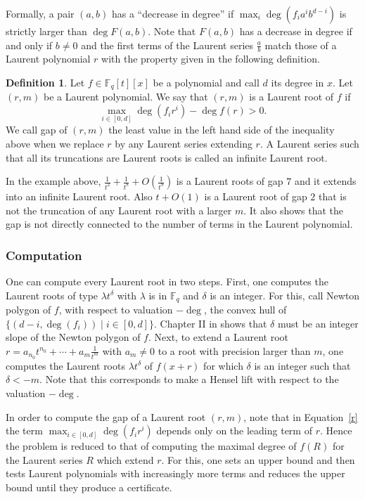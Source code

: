 \documentclass[a4wide]{article}
\newcommand{\F}{{\mathbb F}}
\theoremstyle{plain}
\theoremstyle{definition}
\newtheorem{deff}[theo]{Definition}
\theoremstyle{remark}
\begin{document}
Formally, a pair $(a,b)$ has a ``decrease in degree'' if $\max_i \deg( f_i
a^i b^{d-i})$ is strictly larger than $\deg F(a,b)$. Note that $F(a,b)$
has a decrease in degree if and only if $b\neq 0$ and the first terms of the Laurent series
$\frac{a}{b}$ match those of a Laurent polynomial $r$ with the property
given in the following definition.

\begin{deff}\label{def-Laurent}
	Let $f\in\F_q[t][x]$ be a polynomial and call $d$ its degree in $x$.
	Let $(r,m)$ be a Laurent polynomial. We say that $(r,m)$ is a Laurent root of $f$ if \begin{equation}\label{r}
	\max_{i\in[0,d]}\deg(f_ir^i)-\deg f(r) > 0.
	\end{equation}
	We call gap of $(r,m)$ the least value in the left hand side of the
	inequality above when we
	replace $r$ by any Laurent series extending $r$. A Laurent series such that
all its truncations are Laurent roots is called an infinite Laurent root. 
\end{deff}
In the example above, $\frac{1}{t^2}+\frac{1}{t^8}+O(\frac{1}{t^9})$ is a
Laurent roots of gap $7$ and it extends into an infinite Laurent root. Also
$t+O(1)$ is a Laurent root of gap $2$ that is not the truncation of any
Laurent root with a larger $m$. It also shows that the gap is not directly
connected to the number of terms in the Laurent polynomial.


\subsubsection{Computation} 
One can compute every Laurent root in two steps. First, one computes the Laurent
roots of type $\lambda t^\delta$ with $\lambda$ is in $\F_q$ and $\delta$
is an integer. For this, call
Newton polygon of $f$, with respect to valuation $-\deg$, the convex hull of
$\{(d-i,\deg(f_{i}))\mid i\in[0,d]\}$. Chapter II in \cite{Neu99} shows that
$\delta$ must be an integer slope of the Newton
polygon of $f$. Next, to extend a Laurent root 
$r=a_{n_0}t^{n_0}+\cdots+a_m\frac{1}{t^m}$ with $a_m\neq 0$ to a root
with precision larger than $m$, one computes the Laurent
roots $\lambda t^\delta$ of $f(x+r)$ for which $\delta$ is an integer such that
$\delta < -m$. Note that this corresponds to make a Hensel lift with respect to
the valuation $-\deg$.

In order to compute the gap of a Laurent root $(r,m)$, note that in Equation~\ref{r} the term $\max_{i\in[0,d]}\deg(f_ir^i)$ depends
only on the leading term of $r$. Hence the problem is reduced to that of
computing the maximal degree of
$f(R)$ for the Laurent series $R$ which extend $r$.  For this, one sets an
upper bound and then tests Laurent
polynomials with increasingly more terms and reduces the upper bound
until they produce a certificate. 
\end{document}
